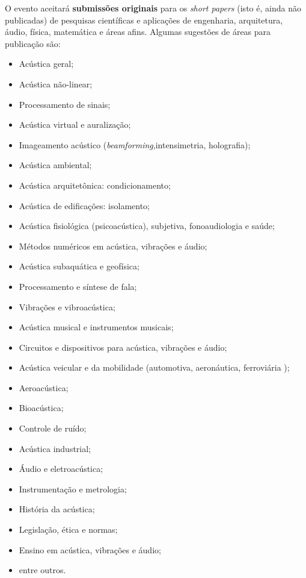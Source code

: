 O evento aceitará \textbf{submissões originais} para os \textit{short papers} (isto é, ainda não publicadas) de pesquisas científicas e aplicações de engenharia, arquitetura, áudio, física, matemática e áreas afins. 
%
Algumas sugestões de áreas para publicação são:
%	
\begin{itemize}[noitemsep,topsep=-1ex] \itemsep=1.5pt
\item[\textbullet] Acústica geral; 
\item[\textbullet] Acústica não-linear; 
\item[\textbullet] Processamento de sinais; 
\item[\textbullet] Acústica virtual e auralização; 
\item[\textbullet] Imageamento acústico (\textit{beamforming},\linebreak intensimetria, holografia); 
\item[\textbullet] Acústica ambiental; 
\item[\textbullet] Acústica arquitetônica: condicionamento; 
\item[\textbullet] Acústica de edificações: isolamento; 
\item[\textbullet] Acústica fisiológica (psicoacústica), subjetiva, fonoaudiologia e saúde; 
\item[\textbullet] Métodos numéricos em acústica, vibrações e áudio;  
\item[\textbullet] Acústica subaquática e geofísica; 
\item[\textbullet] Processamento e síntese de fala; 
\item[\textbullet] Vibrações e vibroacústica;
\item[\textbullet] Acústica musical e instrumentos musicais; 
\item[\textbullet] Circuitos e dispositivos para acústica, vibrações e áudio;
\item[\textbullet] Acústica veicular e da mobilidade (automotiva, aeronáutica, ferroviária \etc); 
\item[\textbullet] Aeroacústica; 
\item[\textbullet] Bioacústica; 
\item[\textbullet] Controle de ruído; 
\item[\textbullet] Acústica industrial; 
\item[\textbullet] Áudio e eletroacústica; 
\item[\textbullet] Instrumentação e metrologia; 
\item[\textbullet] História da acústica; 
\item[\textbullet] Legislação, ética e normas;
\item[\textbullet] Ensino em acústica, vibrações e áudio;
\item[\textbullet] entre outros.
\end{itemize}
\vspace{2mm}	

